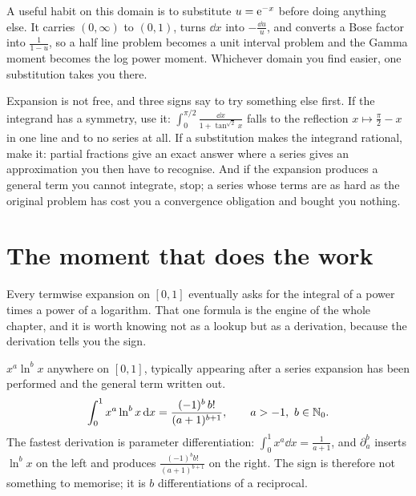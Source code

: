 A useful habit on this domain is to substitute $u=\mathrm{e}^{-x}$ before doing anything else. It carries $(0,\infty)$ to $(0,1)$, turns $\dd x$ into $-\tfrac{\dd u}{u}$, and converts a Bose factor into $\frac{1}{1-u}$, so a half line problem becomes a unit interval problem and the Gamma moment becomes the log power moment. Whichever domain you find easier, one substitution takes you there.

\begin{keynote}
Expansion is not free, and three signs say to try something else first. If the integrand has a symmetry, use it: $\int_0^{\pi/2}\frac{\dd x}{1+\tan^{\sqrt2}x}$ falls to the reflection $x\mapsto\tfrac{\pi}{2}-x$ in one line and to no series at all. If a substitution makes the integrand rational, make it: partial fractions give an exact answer where a series gives an approximation you then have to recognise. And if the expansion produces a general term you cannot integrate, stop; a series whose terms are as hard as the original problem has cost you a convergence obligation and bought you nothing.
\end{keynote}

\section{The moment that does the work}

Every termwise expansion on $[0,1]$ eventually asks for the integral of a power times a power of a logarithm. That one formula is the engine of the whole chapter, and it is worth knowing not as a lookup but as a derivation, because the derivation tells you the sign.

\cue $x^{a}\ln^{b}x$ anywhere on $[0,1]$, typically appearing after a series expansion has been performed and the general term written out.
\method
\[\int_0^1x^{a}\ln^{b}x\,\mathrm{d} x=\frac{(-1)^{b}\,b!}{(a+1)^{b+1}},\qquad a>-1,\ b\in\mathbb{N}_0.\]
The fastest derivation is parameter differentiation: $\int_0^1x^{a}\dd x=\frac{1}{a+1}$, and $\partial_a^{b}$ inserts $\ln^{b}x$ on the left and produces $\frac{(-1)^{b}b!}{(a+1)^{b+1}}$ on the right. The sign is therefore not something to memorise; it is $b$ differentiations of a reciprocal.

